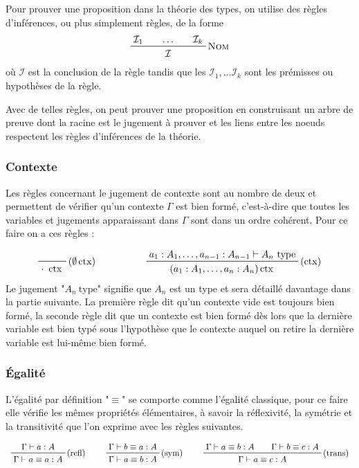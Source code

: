 \documentclass[../../rapport.tex]{subfiles}
\begin{document}
  Pour prouver une proposition dans la théorie des types, on utilise des règles d'inférences, ou plus simplement règles, de la forme
  $$
  \prfinterspace=2em
  \prftree[r]{\textsc{Nom}}{\mathcal I_1}{\hdots}{\mathcal I_k}{\mathcal I}
  $$
  où $\mathcal I$ est la conclusion de la règle tandis que les $\mathcal I_1, \hdots \mathcal I_k$
  sont les prémisses ou hypothèses de la règle.

  Avec de telles règles, on peut prouver une proposition en construisant un arbre de preuve
  dont la racine est le jugement à prouver et les liens entre les noeuds respectent les règles d'inférences de la théorie.

  \subsubsection{Contexte}

  Les règles concernant le jugement de contexte sont au nombre de deux et permettent de vérifier qu'un contexte $\Gamma$ est bien formé,
  c'est-à-dire que toutes les variables et jugements apparaissant dans $\Gamma$ sont dans un ordre cohérent.
  Pour ce faire on a ces règles :

  $$
  \begin{array}{cc}
    \prfbyaxiom{($\emptyset\ctx$)}{\cdot\ \ctx} \hspace{1.5cm}
    & \prftree[r]{($\ctx$)}{a_1 : A_1, \hdots, a_{n-1} : A_{n-1} \vdash A_n\ \text{type}}
      {(a_1 : A_1, \hdots, a_n : A_n) \ctx}
  \end{array}
  $$
  Le jugement "$A_n\ \text{type}$" signifie que $A_n$ est un type et sera détaillé davantage dans la partie suivante.
  La première règle dit qu'un contexte vide est toujours bien formé, la seconde règle dit que un contexte est bien formé
  dès lors que la dernière variable est bien typé sous l'hypothèse que le contexte auquel on retire la dernière variable
  est lui-même bien formé.

  \subsubsection{Égalité}

  L'égalité par définition "$\equiv$" se comporte comme l'égalité classique, pour ce faire elle vérifie les mêmes propriétés élémentaires,
  à savoir la réflexivité, la symétrie et la transitivité que l'on exprime avec les règles suivantes.

  $$
  \prfinterspace=2em
  \begin{array}{ccc}
    \prftree[r]{(refl)}{\Gamma \vdash a : A}{\Gamma \vdash a \equiv a : A} \hspace{0.5cm}
    & \prftree[r]{(sym)} {\Gamma \vdash b \equiv a : A}{\Gamma \vdash a \equiv b : A} \hspace{0.5cm}
    & \prftree[r]{(trans)}{\Gamma \vdash a \equiv b : A}{\Gamma \vdash b \equiv c : A}{\Gamma \vdash a \equiv c : A}
  \end{array}
  $$
\end{document}
